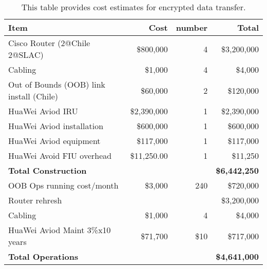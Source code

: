 \tiny \begin{longtable} {|l|r|r|r|} \caption{This table provides cost estimates for encrypted data transfer. \label{tab:ipsec}}\\ 
\hline 
\textbf{Item}&\textbf{Cost}&\textbf{number}&\textbf{Total} \\ \hline
{Cisco Router (2@Chile 2@SLAC)}&{\$800,000}&{4}&{\$3,200,000} \\ \hline
{Cabling}&{\$1,000}&{4}&{\$4,000} \\ \hline
{Out of Bounds (OOB) link  install (Chile)}&{\$60,000}&{2}&{\$120,000} \\ \hline
{HuaWei Aviod IRU}&{\$2,390,000}&{1}&{\$2,390,000} \\ \hline
{HuaWei Aviod installation}&{\$600,000}&{1}&{\$600,000} \\ \hline
{HuaWei Aviod equipment}&{\$117,000}&{1}&{\$117,000} \\ \hline
{HuaWei Avoid FIU overhead}&{\$11,250.00}&{1}&{\$11,250} \\ \hline
\textbf{Total Construction}&\textbf{}&\textbf{}&\textbf{\$6,442,250} \\ \hline
{OOB Ops running cost/month}&{\$3,000}&{240}&{\$720,000} \\ \hline
{Router rehresh}&{}&{ }&{\$3,200,000} \\ \hline
{Cabling}&{\$1,000}&{4}&{\$4,000} \\ \hline
{HuaWei Aviod Maint 3\%x10 years}&{\$71,700}&{\$10}&{\$717,000} \\ \hline
\textbf{Total Operations}&\textbf{}&\textbf{}&\textbf{\$4,641,000} \\ \hline
\end{longtable} \normalsize
